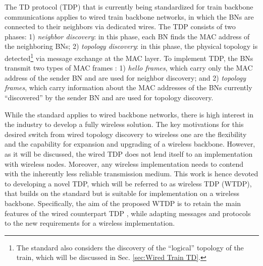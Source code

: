 \documentclass[10pt,english,two column]{IEEEtran}
\begin{document}
The TD protocol (TDP) \cite{IEC 61375} that is currently being standardized
for train backbone communications applies to wired train backbone
networks, in which the BNs are connected to their neighbors via dedicated
wires. The TDP consists of two phases: 1) \emph{neighbor discovery}:
in this phase, each BN finds the MAC address of the neighboring BNs;
2) \emph{topology discovery}: in this phase, the physical topology
is detected\footnote{The standard also considers the discovery of the ``logical'' topology
of the train, which will be discussed in Sec. \ref{sec:Wired Train TD}.} via message exchange at the MAC layer. To implement TDP, the BNs
transmit two types of MAC frames \cite{IEC 61375}: 1) \textit{hello
frames}, which carry only the MAC address of the sender BN and are
used for neighbor discovery; and 2) \textit{topology frames}, which
carry information about the MAC addresses of the BNs currently ``discovered''
by the sender BN and are used for topology discovery. 

While the standard \cite{IEC 61375} applies to wired backbone networks,
there is high interest in the industry to develop a fully wireless
solution. The key motivations for this desired switch from wired topology
discovery to wireless one are the flexibility and the capability for
expansion and upgrading of a wireless backbone. However, as it will
be discussed, the wired TDP \cite{IEC 61375} does not lend itself
to an implementation with wireless nodes. Moreover, any wireless implementation
needs to contend with the inherently less reliable transmission medium.
This work is hence devoted to developing a novel TDP, which will be
referred to as wireless TDP (WTDP), that builds on the standard \cite{IEC 61375}
but is suitable for implementation on a wireless backbone. Specifically,
the aim of the proposed WTDP is to retain the main features of the
wired counterpart TDP \cite{IEC 61375}, while adapting messages and
protocols to the new requirements for a wireless implementation. 
\end{document}
